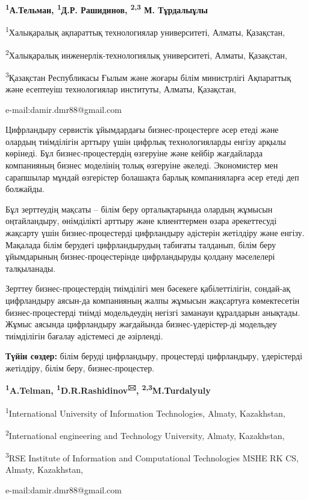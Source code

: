 \begin{center}

{\bfseries \textsuperscript{1}А.Тельман, \textsuperscript{1}Д.Р. Рашидинов\envelope, \textsuperscript{2,3} М. Тұрдалыұлы}

\textsuperscript{1}Халықаралық ақпараттық технологиялар университеті, Алматы, Қазақстан,

\textsuperscript{2}Халықаралық инженерлік-технологиялық университеті, Алматы, Қазақстан,

\textsuperscript{3}Қазақстан Республикасы Ғылым және жоғары білім министрлігі Ақпараттық
және есептеуіш технологиялар институты, Алматы, Қазақстан,

e-mail:damir.dmr88@gmail.com
\end{center}

Цифрландыру сервистік ұйымдардағы бизнес-процестерге әсер етеді және
олардың тиімділігін арттыру үшін цифрлық технологияларды енгізу арқылы
көрінеді. Бұл бизнес-процестердің өзгеруіне және кейбір жағдайларда
компанияның бизнес моделінің толық өзгеруіне әкеледі. Экономистер мен
сарапшылар мұндай өзгерістер болашақта барлық компанияларға әсер етеді
деп болжайды.

Бұл зерттеудің мақсаты -- білім беру орталықтарында олардың жұмысын
оңтайландыру, өнімділікті арттыру және клиенттермен өзара әрекеттесуді
жақсарту үшін бизнес-процестерді цифрландыру әдістерін жетілдіру және
енгізу. Мақалада білім берудегі цифрландырудың табиғаты талданып, білім
беру ұйымдарының бизнес-процестерінде цифрландыруды қолдану мәселелері
талқыланады.

Зерттеу бизнес-процестердің тиімділігі мен бәсекеге қабілеттілігін,
сондай-ақ цифрландыру аясын-да компанияның жалпы жұмысын жақсартуға
көмектесетін бизнес-процестерді тиімді модельдеудің негізгі заманауи
құралдарын анықтады. Жұмыс аясында цифрландыру жағдайында
бизнес-үдерістер-ді модельдеу тиімділігін бағалау әдістемесі де
әзірленді.

{\bfseries Түйін сөздер:} білім беруді цифрландыру, процестерді
цифрландыру, үдерістерді жетілдіру, білім беру, бизнес-процестер.

\begin{center}

{\bfseries \textsuperscript{1}A.Telman, \textsuperscript{1}D.R.Rashidinov\textsuperscript{🖂}, \textsuperscript{2,3}M.Turdalyuly}

\textsuperscript{1}International University of Information Technologies, Almaty, Kazakhstan,

\textsuperscript{2}International engineering and Technology University, Almaty, Kazakhstan,

\textsuperscript{3}RSE Institute of Information and Computational Technologies MSHE RK CS, Almaty, Kazakhstan,

e-mail:damir.dmr88@gmail.com
\end{center}

